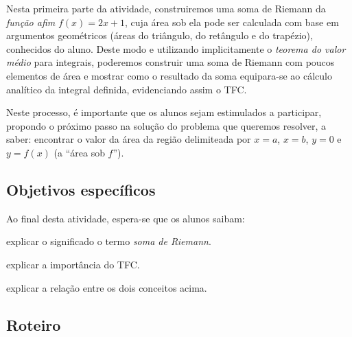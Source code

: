 \documentclass[a4paper,12pt]{scrartcl}
\begin{document}
    Nesta primeira parte da atividade, construiremos uma soma de Riemann da \emph{função afim} $f(x) = 2x + 1$, cuja área sob ela pode ser calculada com base em argumentos geométricos (áreas do triângulo, do retângulo e do trapézio), conhecidos do aluno. Deste modo e utilizando implicitamente o \emph{teorema do valor médio} para integrais, poderemos construir uma soma de Riemann com poucos elementos de área e mostrar como o resultado da soma equipara-se ao cálculo analítico da integral definida, evidenciando assim o TFC.
    
    Neste processo, é importante que os alunos sejam estimulados a participar, propondo o próximo passo na solução do problema que queremos resolver, a saber: encontrar o valor da área da região delimiteada por $x = a$, $x = b$, $y = 0 $ e $y = f(x)$ (a ``área sob $f$'').
  
    \subsection*{Objetivos específicos}
  
    Ao final desta atividade, espera-se que os alunos saibam:
    \begin{compactitem}
      \item explicar o significado o termo \emph{soma de Riemann}.
      \item explicar a importância do TFC.
      \item explicar a relação entre os dois conceitos acima.
    \end{compactitem}
  
    \subsection*{Roteiro}
  
\end{document}
